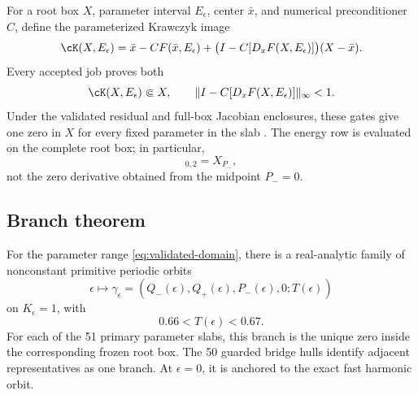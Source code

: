 For a root box \(X\), parameter interval \(E_\epsilon\), center \(\bar x\),
and numerical preconditioner \(C\), define the parameterized Krawczyk image
\begin{equation}
 \cK(X,E_\epsilon)=
 \bar x-CF(\bar x,E_\epsilon)
 +\bigl(I-C[D_xF(X,E_\epsilon)]\bigr)(X-\bar x).
 \label{eq:krawczyk-operator}
\end{equation}
Every accepted job proves both
\begin{equation}
 \cK(X,E_\epsilon)\Subset X,
 \qquad
 \|I-C[D_xF(X,E_\epsilon)]\|_\infty<1.
 \label{eq:krawczyk-gates}
\end{equation}
Under the validated residual and full-box Jacobian enclosures, these gates
give one zero in \(X\) for every fixed parameter in the slab
\citep{Krawczyk1969,MooreKearfottCloud2009}.  The energy row is evaluated on
the complete root box; in particular,
\begin{equation}
 [D_xF(X,E_\epsilon)]_{0,2}=X_{P_-},
 \label{eq:energy-jacobian-row}
\end{equation}
not the zero derivative obtained from the midpoint \(P_-=0\).

\subsection{Branch theorem}

\begin{theorem}
\label{thm:validated-branch}
For the parameter range \cref{eq:validated-domain}, there is a real-analytic
family of nonconstant primitive periodic orbits
\begin{equation}
 \epsilon\longmapsto
 \gamma_\epsilon=
 (Q_-(\epsilon),Q_+(\epsilon),P_-(\epsilon),0;T(\epsilon))
 \label{eq:validated-family}
\end{equation}
on \(K_\epsilon=1\), with
\begin{equation}
 0.66<T(\epsilon)<0.67.
 \label{eq:validated-period-box}
\end{equation}
For each of the 51 primary parameter slabs, this branch is the unique zero
inside the corresponding frozen root box.  The 50 guarded bridge hulls
identify adjacent representatives as one branch.  At \(\epsilon=0\), it is
anchored to the exact fast harmonic orbit.
\end{theorem}

